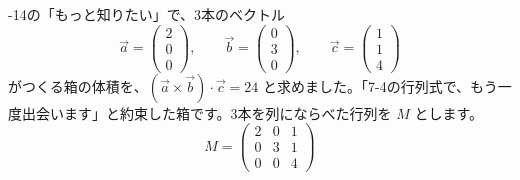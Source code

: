 -14の「もっと知りたい」で、3本のベクトル
\[ \vec a=\begin{pmatrix}2\\0\\0\end{pmatrix},\qquad \vec b=\begin{pmatrix}0\\3\\0\end{pmatrix},\qquad \vec c=\begin{pmatrix}1\\1\\4\end{pmatrix} \]
がつくる箱の体積を、$(\vec a\times\vec b)\cdot\vec c=24$ と求めました。「7-4の行列式で、もう一度出会います」と約束した箱です。3本を列にならべた行列を $M$ とします。
\[ M=\begin{pmatrix}2&0&1\\0&3&1\\0&0&4\end{pmatrix} \]
